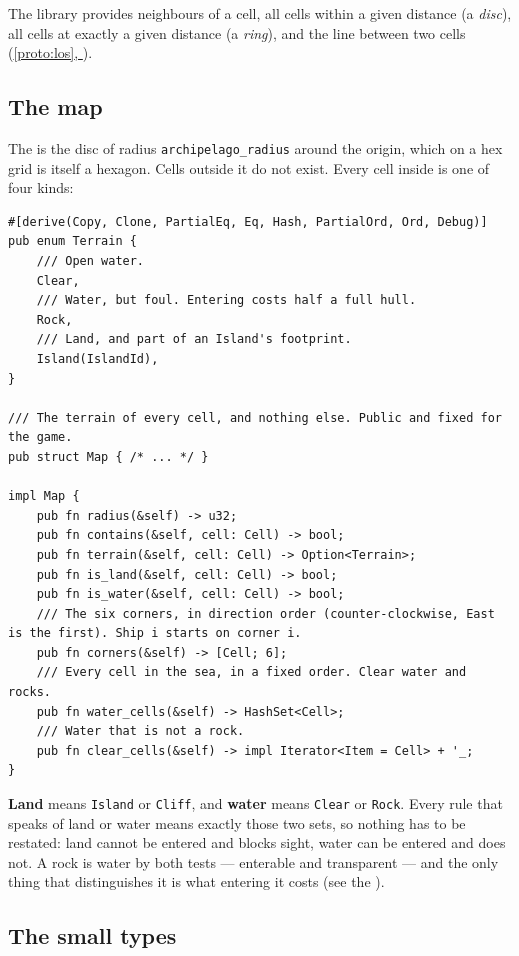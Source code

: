 \documentclass{article}
\newcommand{\fullref}[1]{\hyperref[#1]{\cref*{#1}, \nameref*{#1}}}
\begin{document}
The library provides neighbours of a cell, all cells within a given distance (a \emph{disc}), all
cells at exactly a given distance (a \emph{ring}), and the line between two cells
(\fullref{proto:los}).

\subsection{The map}
\label{proto:map}

The \archipelago{} is the disc of radius \texttt{archipelago\_radius} around the origin, which on
a hex grid is itself a hexagon. Cells outside it do not exist. Every cell inside is one of four
kinds:

\begin{lstlisting}
#[derive(Copy, Clone, PartialEq, Eq, Hash, PartialOrd, Ord, Debug)]
pub enum Terrain {
    /// Open water.
    Clear,
    /// Water, but foul. Entering costs half a full hull.
    Rock,
    /// Land, and part of an Island's footprint.
    Island(IslandId),
}

/// The terrain of every cell, and nothing else. Public and fixed for the game.
pub struct Map { /* ... */ }

impl Map {
    pub fn radius(&self) -> u32;
    pub fn contains(&self, cell: Cell) -> bool;
    pub fn terrain(&self, cell: Cell) -> Option<Terrain>;
    pub fn is_land(&self, cell: Cell) -> bool;
    pub fn is_water(&self, cell: Cell) -> bool;
    /// The six corners, in direction order (counter-clockwise, East is the first). Ship i starts on corner i.
    pub fn corners(&self) -> [Cell; 6];
    /// Every cell in the sea, in a fixed order. Clear water and rocks.
    pub fn water_cells(&self) -> HashSet<Cell>;
    /// Water that is not a rock.
    pub fn clear_cells(&self) -> impl Iterator<Item = Cell> + '_;
}
\end{lstlisting}

\textbf{Land} means \texttt{Island} or \texttt{Cliff}, and \textbf{water} means \texttt{Clear} or
\texttt{Rock}. Every rule that speaks of land or water means exactly those two sets, so nothing
has to be restated: land cannot be entered and blocks sight, water can be entered and does not. A
rock is water by both tests --- enterable and transparent --- and the only thing that
distinguishes it is what entering it costs (see the \MD).

\subsection{The small types}
\label{proto:types}
\end{document}
